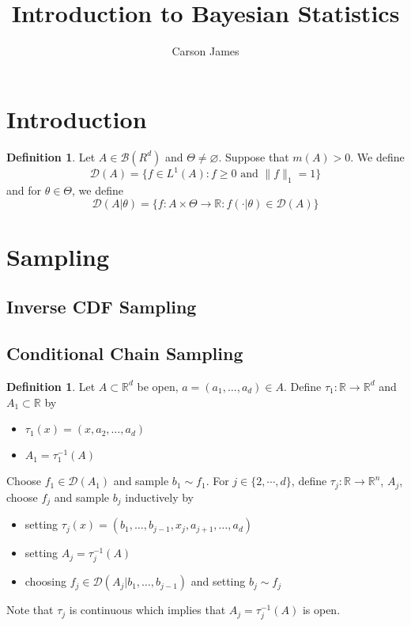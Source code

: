 \documentclass[12pt]{amsart}
\theoremstyle{definition}
\newtheorem{defn}[definition]{Definition}
\theoremstyle{remark}
\theoremstyle{definition}
\newcommand{\R}{\mathbb{R}}
\newcommand{\MB}{\mathcal{B}}
\newcommand{\MD}{\mathcal{D}}
\begin{document}
	
	\title{Introduction to Bayesian Statistics}
	\author{Carson James}
	\maketitle
	
	\tableofcontents
	
	\section{Introduction}
	\begin{defn}
		Let $A \in \MB(R^d)$ and $\Theta \neq \varnothing$. Suppose that $m(A) > 0$. We define 
		$$\MD(A) = \{f \in L^1(A) : f \geq 0 \text{ and } \|f\|_1 = 1\}$$ 
		and for $\theta \in \Theta$, we define
		$$\MD(A|\theta) = \{f: A \times \Theta \rightarrow \R : f(\cdot| \theta) \in \MD(A)\}$$
	\end{defn}
	
	\section{Sampling}
	
	\subsection{Inverse CDF Sampling}
	
	\subsection{Conditional Chain Sampling}
	\begin{defn}
	Let $A \subset \R^d$ be open, $a = (a_1, \dots, a_d) \in A$. Define $\tau_1:\R \rightarrow \R^d$ and $A_1 \subset \R$ by 
	\begin{itemize}
	\item $\tau_1(x) = (x, a_2, \ldots, a_d)$
	\item $A_1 = \tau_1^{-1}(A)$
\end{itemize}	 
	Choose $f_1 \in \MD(A_1)$ and sample $b_1 \sim f_1$. For $j \in \{2, \cdots, d\}$, define $\tau_j: \R \rightarrow \R^n$, $A_j$, choose $f_j$ and sample $b_j$ inductively by 
	\begin{itemize}
	\item setting $\tau_j(x) = (b_1, \dots, b_{j-1}, x_j, a_{j+1}, \dots, a_d)$  
	\item setting $A_j = \tau_j^{-1}(A)$
	\item choosing $f_j \in \MD(A_j|b_1, \ldots, b_{j-1})$
	and
	setting $b_j \sim f_j$ 
	\end{itemize}
	Note that $\tau_j$ is continuous which implies that $A_j = \tau_j^{-1}(A)$ is open.
	
	\end{defn}	
	
\end{document}
